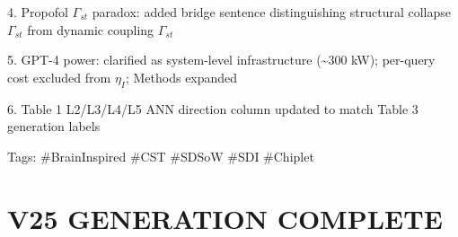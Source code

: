 \documentclass[a4paper,12pt]{article}
\begin{document}
4. Propofol $\Gamma_{st}$ paradox: added bridge sentence distinguishing structural collapse $\Gamma_{st}$ from dynamic coupling $\Gamma_{st}$

5. GPT-4 power: clarified as system-level infrastructure (\textasciitilde{}300 kW); per-query cost excluded from $\eta_{I}$; Methods expanded

6. Table 1 L2/L3/L4/L5 ANN direction column updated to match Table 3 generation labels

Tags: \#BrainInspired \#CST \#SDSoW \#SDI \#Chiplet

\section*{V25 GENERATION COMPLETE}
\end{document}
